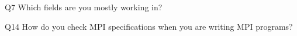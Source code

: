 \begin{description}%
\item{Q7} Which fields are you mostly working in?%
\item{Q14} How do you check MPI specifications when you are writing MPI programs?%
\end{description}%
